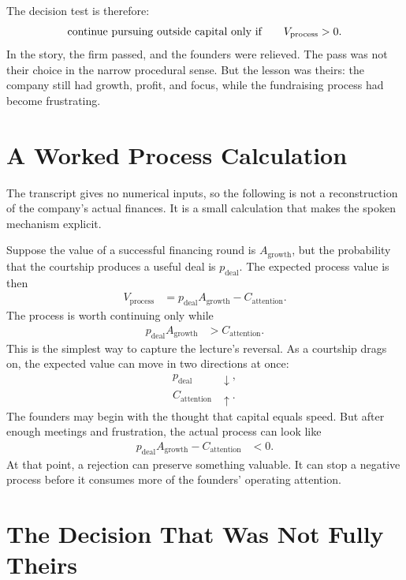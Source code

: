 The decision test is therefore:
\begin{equation}
\hbox{continue pursuing outside capital only if}
\qquad
V_{\mathrm{process}} > 0 .
\end{equation}
In the story, the firm passed, and the founders were relieved. The pass was not their choice in the narrow procedural sense. But the lesson was theirs: the company still had growth, profit, and focus, while the fundraising process had become frustrating.

\section{A Worked Process Calculation}

The transcript gives no numerical inputs, so the following is not a reconstruction of the company's actual finances. It is a small calculation that makes the spoken mechanism explicit.

Suppose the value of a successful financing round is \(A_{\mathrm{growth}}\), but the probability that the courtship produces a useful deal is \(p_{\mathrm{deal}}\). The expected process value is then
\begin{align}
V_{\mathrm{process}}
&=
p_{\mathrm{deal}}A_{\mathrm{growth}}
-
C_{\mathrm{attention}} .
\end{align}
The process is worth continuing only while
\begin{align}
p_{\mathrm{deal}}A_{\mathrm{growth}}
&>
C_{\mathrm{attention}} .
\end{align}
This is the simplest way to capture the lecture's reversal. As a courtship drags on, the expected value can move in two directions at once:
\begin{align}
p_{\mathrm{deal}} &\downarrow,\\
C_{\mathrm{attention}} &\uparrow.
\end{align}
The founders may begin with the thought that capital equals speed. But after enough meetings and frustration, the actual process can look like
\begin{align}
p_{\mathrm{deal}}A_{\mathrm{growth}}
-
C_{\mathrm{attention}}
&< 0 .
\end{align}
At that point, a rejection can preserve something valuable. It can stop a negative process before it consumes more of the founders' operating attention.

\section{The Decision That Was Not Fully Theirs}

